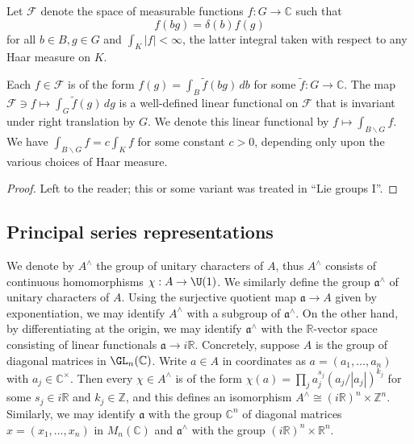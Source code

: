 \documentclass[reqno]{amsart} 
\begin{document}
Let $\mathcal{F}$ denote the space of measurable functions $f : G \rightarrow \mathbb{C}$ such that
\begin{equation}\label{eqn:}
  f(b g) = \delta(b) f(g)
\end{equation}
for all $b \in B, g \in G$ and $\int_K |f| < \infty$, the latter integral taken with respect to any Haar measure on $K$.

\begin{lemma}
  Each $f \in \mathcal{F}$ is of the form $f(g) = \int_{B} \tilde{f}(b g) \, d b$ for some $\tilde{f} : G \rightarrow \mathbb{C}$.  The map $\mathcal{F} \ni f \mapsto \int_G \tilde{f}(g) \, d g$ is a well-defined linear functional on $\mathcal{F}$ that is invariant under right translation by $G$.  We denote this linear functional by $f \mapsto \int_{B \backslash G} f$.  We have $\int_{B \backslash G} f = c \int_K f$ for some constant $c > 0$, depending only upon the various choices of Haar measure.
\end{lemma}
\begin{proof}
  Left to the reader; this or some variant was treated in ``Lie groups I''.
\end{proof}

\subsection{Principal series representations}
We denote by $A^\wedge$ the group of unitary characters of $A$, thus $A^\wedge$ consists of continuous homomorphisms $\chi : A \rightarrow \U(1)$.  We similarly define the group $\mathfrak{a}^\wedge$ of unitary characters of $A$.  Using the surjective quotient map $\mathfrak{a} \rightarrow A$ given by exponentiation, we may identify $A^\wedge$ with a subgroup of $\mathfrak{a}^\wedge$.  On the other hand, by differentiating at the origin, we may identify $\mathfrak{a}^\wedge$ with the $\mathbb{R}$-vector space consisting of linear functionals $\mathfrak{a} \rightarrow i\mathbb{R}$.  Concretely, suppose $A$ is the group of diagonal matrices in $\GL_n(\mathbb{C})$.  Write $a \in A$ in coordinates as $a = (a_1,\dotsc,a_n)$ with $a_j \in \mathbb{C}^\times$.  Then every $\chi \in A^\wedge$ is of the form $\chi(a) = \prod_j a_j^{s_j} (a_j/|a_j|)^{k_j}$ for some $s_j \in i \mathbb{R}$ and $k_j \in \mathbb{Z}$, and this defines an isomorphism $A^\wedge \cong (i \mathbb{R})^n \times \mathbb{Z}^n$.  Similarly, we may identify $\mathfrak{a}$ with the group $\mathbb{C}^n$ of diagonal matrices $x = (x_1,\dotsc,x_n)$ in $M_n(\mathbb{C})$ and $\mathfrak{a}^\wedge$ with the group $(i \mathbb{R})^n \times \mathbb{R}^n$.
\end{document}
